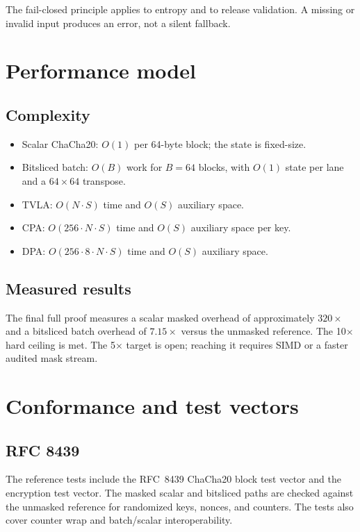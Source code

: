 \documentclass[11pt,a4paper]{article}
\theoremstyle{plain}
\theoremstyle{definition}
\theoremstyle{remark}
\begin{document}
The fail-closed principle applies to entropy and to release validation. A missing or
invalid input produces an error, not a silent fallback.

\section{Performance model}\label{sec:performance}

\subsection{Complexity}

\begin{itemize}[leftmargin=1.5em]
  \item Scalar ChaCha20: \(O(1)\) per 64-byte block; the state is fixed-size.
  \item Bitsliced batch: \(O(B)\) work for \(B=64\) blocks, with \(O(1)\) state per
        lane and a \(64\times64\) transpose.
  \item TVLA: \(O(N\cdot S)\) time and \(O(S)\) auxiliary space.
  \item CPA: \(O(256\cdot N\cdot S)\) time and \(O(S)\) auxiliary space per key.
  \item DPA: \(O(256\cdot 8\cdot N\cdot S)\) time and \(O(S)\) auxiliary space.
\end{itemize}

\subsection{Measured results}

The final full proof measures a scalar masked overhead of approximately \(320\times\)
and a bitsliced batch overhead of \(7.15\times\) versus the unmasked reference. The
10$\times$ hard ceiling is met. The 5$\times$ target is open; reaching it requires SIMD
or a faster audited mask stream.

\section{Conformance and test vectors}\label{sec:conformance}

\subsection{RFC 8439}

The reference tests include the RFC~8439 ChaCha20 block test vector and the
encryption test vector. The masked scalar and bitsliced paths are checked against the
unmasked reference for randomized keys, nonces, and counters. The tests also cover
counter wrap and batch/scalar interoperability.
\end{document}
